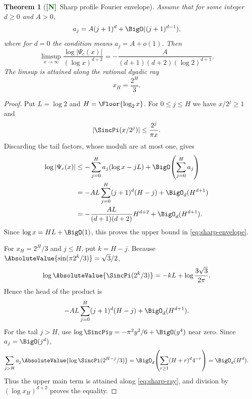 \documentclass[11pt]{article}
\numberwithin{equation}{section}
\newtheorem{theorem}{Theorem}[section]
\theoremstyle{definition}
\theoremstyle{remark}
\newcommand{\New}{\textcolor{darkgreen}{\textsf{\textbf{[N]}}}}
\begin{document}
\begin{theorem}[\New\ Sharp profile Fourier envelope]
\label{thm:Fourier-envelope}
Assume that for some integer $d\ge0$ and $A>0$,
\begin{equation}
 a_j=A(j+1)^d+\BigO((j+1)^{d-1}),
 \label{eq:a-regular-growth}
\end{equation}
where for $d=0$ the condition means $a_j=A+o(1)$.  Then
\begin{equation}
 \boxed{
 \limsup_{x\to\infty}
 \frac{\log|\Psi_c(x)|}{(\log x)^{d+2}}
 =-\frac{A}{(d+1)(d+2)(\log2)^{d+1}}.}
 \label{eq:sharp-envelope}
\end{equation}
The limsup is attained along the rational dyadic ray
\begin{equation}
 x_H=\frac{2^H}{3}.
 \label{eq:sharp-ray}
\end{equation}
\end{theorem}

\begin{proof}
Put $L=\log2$ and $H=\Floor{\log_2x}$.  For $0\le j\le H$ we have
$x/2^j\ge1$ and
\[
 |\SincPi(x/2^j)|
 \le\frac{2^j}{\pi x}.
\]
Discarding the tail factors, whose moduli are at most one, gives
\begin{align*}
 \log|\Psi_c(x)|
 &\le-\sum_{j=0}^{H}a_j(\log x-jL)+\BigO\!\left(\sum_{j=0}^{H}a_j\right)\\
 &=-AL\sum_{j=0}^{H}(j+1)^d(H-j)+\BigO_d(H^{d+1})\\
 &=-\frac{AL}{(d+1)(d+2)}H^{d+2}+\BigO_d(H^{d+1}).
\end{align*}
Since $\log x=HL+\BigO(1)$, this proves the upper bound in
\eqref{eq:sharp-envelope}.

For $x_H=2^H/3$ and $j\le H$, put $k=H-j$.  Because
$\AbsoluteValue{\sin(\pi2^k/3)}=\sqrt3/2$,
\begin{equation}
 \log\AbsoluteValue{\SincPi(2^k/3)}
 =-kL+\log\frac{3\sqrt3}{2\pi}.
 \label{eq:ray-factor}
\end{equation}
Hence the head of the product is
\[
 -AL\sum_{j=0}^{H}(j+1)^d(H-j)+\BigO_d(H^{d+1}).
\]
For the tail $j>H$, use
$\log\SincPi y=-\pi^2y^2/6+\BigO(y^4)$ near zero.  Since
$a_j=\BigO(j^d)$,
\[
 \sum_{j>H}a_j\AbsoluteValue{\log\SincPi(2^{H-j}/3)}
 =\BigO_d\!\left(\sum_{r\ge1}(H+r)^d4^{-r}\right)
 =\BigO_d(H^d).
\]
Thus the upper main term is attained along \eqref{eq:sharp-ray}, and division
by $(\log x_H)^{d+2}$ proves the equality.
\end{proof}
\end{document}
